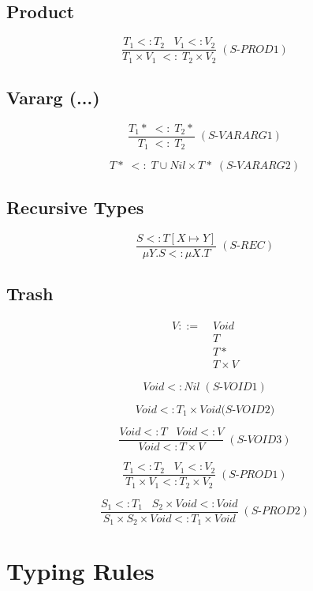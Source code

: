 \documentclass[12pt]{article}
\begin{document}
\subsection{Product}

\[
\frac{T_{1} <: T_{2} \;\;\; V_{1} <: V_{2}}
     {T_{1} \times V_{1} \; <: \; T_{2} \times V_{2}} \; (\textit{S-PROD1})
\]

\subsection{Vararg (...)}

\[
\frac{T_{1}* \; <: \; T_{2}*}
     {T_{1} \; <: \; T_{2}} \; (\textit{S-VARARG1})
\]

\[
T* \; <: \; T \cup Nil \times {T*} \; (\textit{S-VARARG2})
\]

\subsection{Recursive Types}

\[
\frac{S <: T[X \mapsto Y]}
     {\mu Y.S <: \mu X.T} \; (\textit{S-REC})
\]

\subsection{Trash}

\begin{align*}
V ::= \; & Void\\
& T\\
& T*\\
& T \times V
\end{align*}

\[
Void <: Nil \; (\textit{S-VOID1})
\]

\[
Void <: T_{1} \times Void (\textit{S-VOID2)}
\]

\[
\frac{Void <: T \;\;\; Void <: V}
     {Void <: T \times V} \; (\textit{S-VOID3})
\]

\[
\frac{T_{1} <: T_{2} \;\;\; V_{1} <: V_{2}}
     {T_{1} \times V_{1} <: T_{2} \times V_{2}} \; (\textit{S-PROD1})
\]

\[
\frac{S_{1} <: T_{1} \;\;\; S_{2} \times Void <: Void}
     {S_{1} \times S_{2} \times Void <: T_{1} \times Void} \; (\textit{S-PROD2})
\]

\section{Typing Rules}
\end{document}
